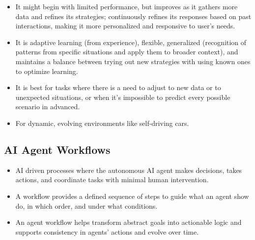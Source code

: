 \documentclass[12pt, letterpaper]{article}
\begin{document}
\begin{itemize}
\begin{itemize}
            \item It might begin with limited performance, but improves as it gathers more data and refines its strategies; continuously refines its responses based on past interactions, making it more personalized and responsive to user's needs.
            \item It is adaptive learning (from experience), flexible, generalized (recognition of patterns from specific situations and apply them to broader context), and maintains a balance between trying out new strategies with using known ones to optimize learning.
            \item It is best for tasks where there is a need to adjust to new data or to unexpected situations, or when it's impossible to predict every possible scenario in advanced.
            \item For dynamic, evolving environments like self-driving cars.
        \end{itemize}
\end{itemize}

\subsection{AI Agent Workflows}
\begin{itemize}
    \item AI driven processes where the autonomous AI agent makes decisions, takes actions, and coordinate tasks with minimal human intervention.
    \item A workflow provides a defined sequence of steps to guide what an agent show do, in which order, and under what conditions.
    \item An agent workflow helps transform abstract goals into actionable logic and supports consistency in agents' actions and evolve over time.
\end{itemize}
\end{document}
